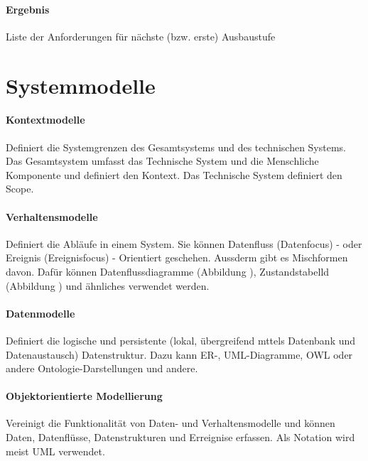 \paragraph{Ergebnis}
Liste der Anforderungen für nächste (bzw. erste) Ausbaustufe

\newpage
\section{Systemmodelle}

\paragraph{Kontextmodelle}
Definiert die Systemgrenzen des Gesamtsystems und des technischen Systems. Das Gesamtsystem umfasst das Technische System und die Menschliche Komponente und definiert den Kontext. Das Technische System definiert den Scope.


\newpage
\paragraph{Verhaltensmodelle}
Definiert die Abläufe in einem System. Sie können Datenfluss (Datenfocus) - oder Ereignis (Ereignisfocus) - Orientiert geschehen. Aussderm gibt es Mischformen davon. Dafür können Datenflussdiagramme (Abbildung ), Zustandstabelld (Abbildung ) und ähnliches verwendet werden.
 


\paragraph{Datenmodelle}
Definiert die logische und persistente (lokal, übergreifend mttels Datenbank und Datenaustausch) Datenstruktur. Dazu kann ER-, UML-Diagramme, OWL oder andere Ontologie-Darstellungen und andere.
 
\newpage
\paragraph{Objektorientierte Modellierung}
Vereinigt die Funktionalität von Daten- und Verhaltensmodelle und können Daten, Datenflüsse, Datenstrukturen und Erreignise erfassen. Als Notation wird meist UML verwendet.

